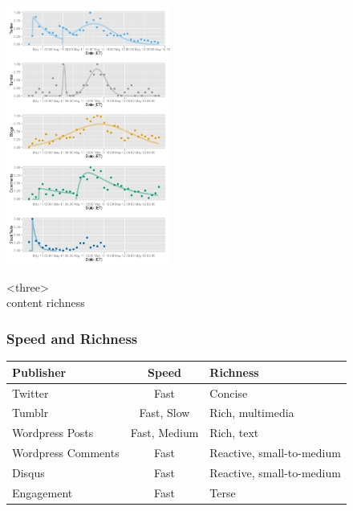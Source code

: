 \documentclass{beamer}
\begin{document}

\begin{frame}
  \begin{center}
    \includegraphics[height=8.5cm]{./imgs/JPMorgan.pdf}
  \end{center}
\end{frame}


\begin{frame}
\begin{center}
{\Huge <three> \\ [10pt] content richness }
\end{center}
\end{frame}


\begin{frame} \frametitle{Speed and Richness}
\begin{table}
\begin{tabular}{m{2cm}| c |m{3cm}}
\hline
   {Publisher}   &   {Speed} & {Richness} \\
\hline 
    Twitter       & Fast & Concise  \\ [3pt]
    Tumblr       & Fast, Slow & Rich, multimedia\\  [3pt]
    Wordpress Posts & Fast, Medium &  Rich, text\\  [3pt]
    Wordpress Comments  & Fast & Reactive, small-to-medium\\  [3pt]
    Disqus         & Fast & Reactive, small-to-medium\\  [3pt]
    Engagement   & Fast & Terse\\ 
\hline
\end{tabular}
\end{table}
\end{frame}
\end{document}
